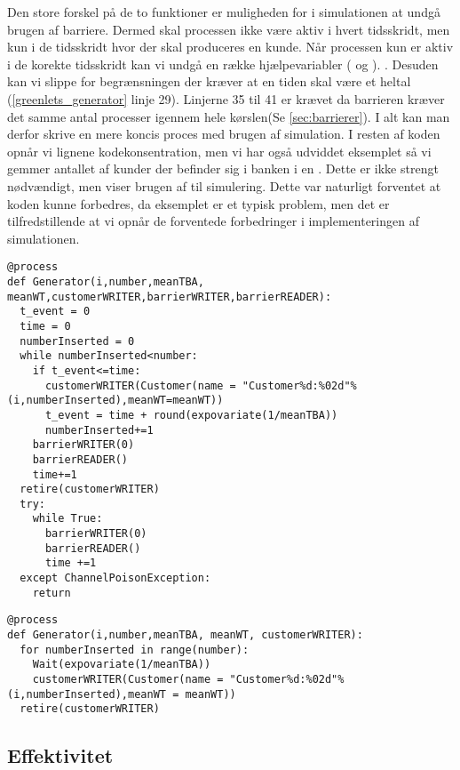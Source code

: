 Den store forskel på de to funktioner er muligheden for i simulationen  at undgå brugen af barriere. Dermed skal processen ikke være aktiv i hvert tidsskridt, men kun i de tidsskridt hvor der skal produceres en kunde. Når processen kun er aktiv i de korekte tidsskridt kan vi undgå en række hjælpevariabler ( og ). . Desuden kan vi slippe for begrænsningen der kræver at en tiden skal være et heltal (\cref{greenlets_generator} linje 29). Linjerne 35 til 41 er krævet da barrieren kræver det samme antal processer igennem hele kørslen(Se \cref{sec:barrierer}). I alt kan man derfor skrive en mere koncis proces med brugen af simulation. I resten af koden opnår vi lignene kodekonsentration, men vi har også udviddet eksemplet så vi gemmer antallet af kunder der befinder sig i banken i en . Dette er ikke strengt nødvændigt, men viser brugen af  til simulering. Dette var naturligt forventet at koden kunne forbedres, da eksemplet er et typisk \des problem, men det er tilfredstillende at vi opnår de forventede forbedringer i implementeringen af simulationen.
\begin{lstlisting}[firstnumber=21, label=greenlets_generator, caption=Generatorprocessen for Greenlets versionen]
@process
def Generator(i,number,meanTBA, meanWT,customerWRITER,barrierWRITER,barrierREADER):
  t_event = 0
  time = 0
  numberInserted = 0
  while numberInserted<number:
    if t_event<=time:
      customerWRITER(Customer(name = "Customer%d:%02d"%(i,numberInserted),meanWT=meanWT))
      t_event = time + round(expovariate(1/meanTBA))
      numberInserted+=1
    barrierWRITER(0)
    barrierREADER()
    time+=1
  retire(customerWRITER)
  try:
    while True:
      barrierWRITER(0)
      barrierREADER()
      time +=1
  except ChannelPoisonException: 
    return
\end{lstlisting}
\begin{lstlisting}[firstnumber=20, label=simulation_generator, caption=Generatorprocessen for Simulationsversionen]
@process
def Generator(i,number,meanTBA, meanWT, customerWRITER):
  for numberInserted in range(number):
    Wait(expovariate(1/meanTBA))
    customerWRITER(Customer(name = "Customer%d:%02d"%(i,numberInserted),meanWT = meanWT))
  retire(customerWRITER)
\end{lstlisting}



  
\subsection{Effektivitet}  

